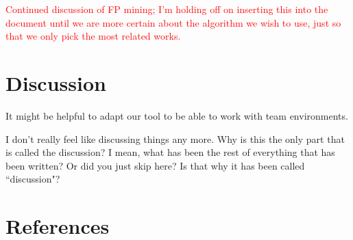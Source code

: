 \documentclass[12pt]{article}
\newcommand{\tcr}{\textcolor{red}}
\begin{document}
\tcr{Continued discussion of FP mining; I'm holding off on inserting this into the document until we are more certain about the algorithm we wish to use, just so that we only pick the most related works.}




\bigskip


\clearpage

\section{Discussion}\label{disc}

It might be helpful to adapt our tool to be able to work with team environments. 

I don't really feel like discussing things any more. Why is this the only part that is called the discussion? I mean, what has been the rest of everything that has been written? Or did you just skip here? Is that why it has been called ``discussion"?

\clearpage

\section{References}\label{references}

\printbibliography
\end{document}
